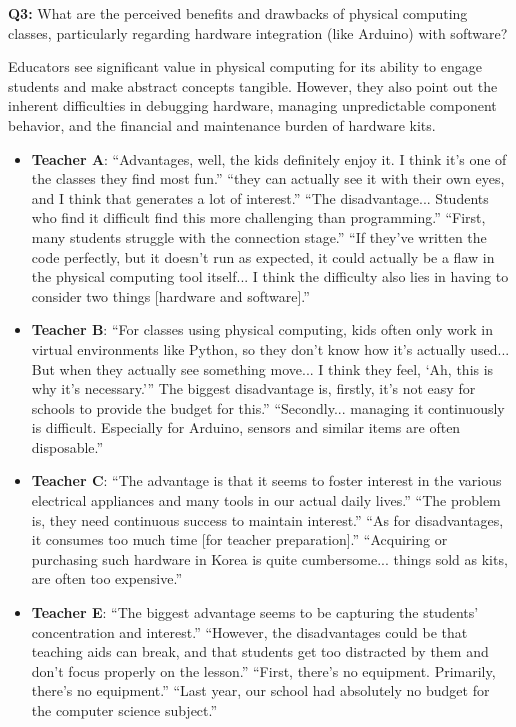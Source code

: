 \documentclass{article} %
\begin{document}
\vspace{1em}
\textbf{Q3:} What are the perceived benefits and drawbacks of physical computing classes, particularly regarding hardware integration (like Arduino) with software?
\begin{summarybox}
Educators see significant value in physical computing for its ability to engage students and make abstract concepts tangible.
However, they also point out the inherent difficulties in debugging hardware, managing unpredictable component behavior, and the financial and maintenance burden of hardware kits.

\begin{itemize}[itemsep=0em, topsep=0.5em, labelsep=0.5em, leftmargin=0.5em]
    \item \textbf{Teacher A}: ``Advantages, well, the kids definitely enjoy it. I think it's one of the classes they find most fun.''  ``they can actually see it with their own eyes, and I think that generates a lot of interest.''  ``The disadvantage... Students who find it difficult find this more challenging than programming.''  ``First, many students struggle with the connection stage.''  ``If they've written the code perfectly, but it doesn't run as expected, it could actually be a flaw in the physical computing tool itself... I think the difficulty also lies in having to consider two things [hardware and software].''
    \item \textbf{Teacher B}: ``For classes using physical computing, kids often only work in virtual environments like Python, so they don't know how it's actually used... But when they actually see something move... I think they feel, `Ah, this is why it's necessary.'''  The biggest disadvantage is, firstly, it's not easy for schools to provide the budget for this.''  ``Secondly... managing it continuously is difficult. Especially for Arduino, sensors and similar items are often disposable.'' 
    \item \textbf{Teacher C}: ``The advantage is that it seems to foster interest in the various electrical appliances and many tools in our actual daily lives.''  ``The problem is, they need continuous success to maintain interest.''  ``As for disadvantages, it consumes too much time [for teacher preparation].''  ``Acquiring or purchasing such hardware in Korea is quite cumbersome... things sold as kits, are often too expensive.''
    \item \textbf{Teacher E}: ``The biggest advantage seems to be capturing the students' concentration and interest.''  ``However, the disadvantages could be that teaching aids can break, and that students get too distracted by them and don't focus properly on the lesson.'' ``First, there's no equipment. Primarily, there's no equipment.''  ``Last year, our school had absolutely no budget for the computer science subject.''

\end{itemize}
\end{summarybox}
\end{document}
